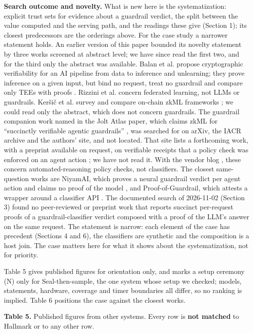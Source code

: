 \documentclass[11pt]{article}
\begin{document}
\textbf{Search outcome and novelty.} What is new here is the systematization: explicit trust sets for evidence about a guardrail verdict, the split between the value computed and the serving path, and the readings these give (Section 1); its closest predecessors are the orderings above. For the case study a narrower statement holds. An earlier version of this paper bounded its novelty statement by three works screened at abstract level; we have since read the first two, and for the third only the abstract was available. Balan et al. propose cryptographic verifiability for an AI pipeline from data to inference and unlearning; they prove inference on a given input, but bind no request, treat no guardrail and compare only TEEs with proofs \cite{F6}. Rizzini et al. \cite{F7} concern federated learning, not LLMs or guardrails. Ker\v{s}i\v{c} et al. survey and compare on-chain zkML frameworks \cite{F8}; we could read only the abstract, which does not concern guardrails. The guardrail companion work named in the Jolt Atlas paper, which claims zkML for ``succinctly verifiable agentic guardrails'' \cite{A14}, was searched for on arXiv, the IACR archive and the authors' site, and not located. That site lists a forthcoming work, with a preprint available on request, on verifiable receipts that a policy check was enforced on an agent action \cite{F10}; we have not read it. With the vendor blog \cite{E1}, these concern automated-reasoning policy checks, not classifiers. The closest same-question works are NiyamAI, which proves a neural guardrail verdict per agent action and claims no proof of the model \cite{A44}, and Proof-of-Guardrail, which attests a wrapper around a classifier API \cite{B24}. The documented search of 2026-11-02 (Section 3) found no peer-reviewed or preprint work that reports succinct per-request proofs of a guardrail-classifier verdict composed with a proof of the LLM's answer on the same request. The statement is narrow: each element of the case has precedent (Sections 4 and 6), the classifiers are synthetic and the composition is a host join. The case matters here for what it shows about the systematization, not for priority.

Table 5 gives published figures for orientation only, and marks a setup ceremony (N) only for Seal-then-sample, the one system whose setup we checked; models, statements, hardware, coverage and timer boundaries all differ, so no ranking is implied. Table 6 positions the case against the closest works.

\textbf{Table 5.} Published figures from other systems. Every row is \textbf{not matched} to Hallmark or to any other row.
\end{document}
